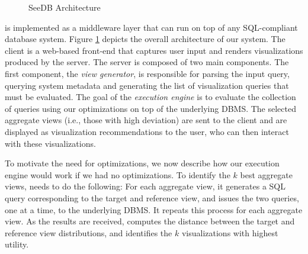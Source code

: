 \begin{figure}[htb]
\vspace{-15pt}
\centerline{
\hbox{}}
\vspace{-12pt}
\caption{SeeDB Architecture}
\vspace{-10pt}
\label{fig:sys-arch}
\end{figure} 


\SeeDB is implemented as a middleware layer that can run on
top of any SQL-compliant database system. 
Figure \ref{fig:sys-arch} depicts the overall architecture of our
system.  The \SeeDB client is a web-based front-end that captures user
input and renders visualizations produced by the \SeeDB server.  The
\SeeDB server is composed of two main components. The first
component, the {\it view generator}, is responsible for parsing the
input query, querying system metadata and generating the list of
visualization queries that must be evaluated.  
The goal of the {\em execution engine} is to evaluate the collection of queries
 using our optimizations on top of
the underlying DBMS.
The selected aggregate views (i.e., those with high deviation) 
are sent to the \SeeDB client 
and are displayed as visualization recommendations to the user, 
who can then interact with these
visualizations.

To motivate the need for optimizations, we now describe 
how our execution engine would work if we had no optimizations. 
To identify the $k$ best aggregate views,
\SeeDB needs to do the following:
For each aggregate view, it generates
a SQL query corresponding to the target
and reference view, and issues
the two queries, one at a time, to the underlying DBMS.
It repeats this process for each aggregate view.
As the results are received, \SeeDB computes the
distance between the target and reference view
distributions, and identifies the $k$ visualizations
with highest utility. 

